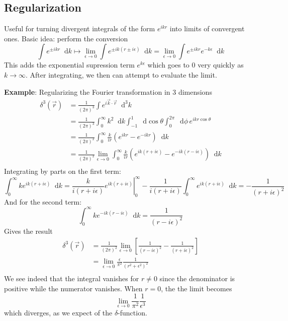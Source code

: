 \documentclass{article}
\newcommand{\diff}{\mathop{}\!\mathrm{d}}
\theoremstyle{definition}
\begin{document}
\subsection{Regularization}
Useful for turning divergent integrals of the form $e^{ikr}$ into limits of convergent
ones. Basic idea: perform the conversion
\begin{equation*}
	\int e^{\pm ikr} \diff k \mapsto \lim_{\epsilon \to 0} \int e^{\pm ik(r \pm i\epsilon)} \diff k = \lim_{\epsilon \to 0} \int e^{\pm ikr} e^{-k\epsilon} \diff k
\end{equation*}
This adds the exponential supression term $e^{k\epsilon}$ which goes to 0 very quickly as
$k \to \infty$. After integrating, we then can attempt to evaluate the limit.

\textbf{Example}: Regularizing the Fourier transformation in 3 dimensions
\begin{equation*}
\begin{split}
	\delta^3(\vec{r})
		&= \frac{1}{(2\pi)^3} \int e^{i\vec{k}\cdot\vec{r}} \diff^3 k \\
		&= \frac{1}{(2\pi)^3} \int_0^\infty k^2 \diff k \int_{-1}^1 \diff \cos\theta \int_0^{2\pi} \diff \phi \, e^{ikr\cos\theta} \\
		&= \frac{1}{(2\pi)^2} \int_0^\infty \frac{k}{ir} \left(e^{ikr} - e^{-ikr}\right) \diff k \\
		&= \frac{1}{(2\pi)^2} \lim_{\epsilon \to 0} \int_0^\infty \frac{k}{ir} \left(e^{ik(r+i\epsilon)} - e^{-ik(r-i\epsilon)}\right) \diff k \\
\end{split}
\end{equation*}
Integrating by parts on the first term:
\begin{equation*}
	\int_0^\infty ke^{ik(r+i\epsilon)} \diff k = \left. \frac{k}{i(r+i\epsilon)}e^{ik(r+i\epsilon)} \right|_0^\infty - \frac{1}{i(r+i\epsilon)} \int_0^\infty e^{ik(r+i\epsilon)} \diff k = -\frac{1}{(r+i\epsilon)^2}
\end{equation*}
And for the second term:
\begin{equation*}
	\int_0^\infty ke^{-ik(r-i\epsilon)} \diff k = \frac{1}{(r-i\epsilon)^2}
\end{equation*}
Gives the result
\begin{equation*}
\begin{split}
	\delta^3(\vec{r})
		&= \frac{1}{(2\pi)^2} \lim_{\epsilon \to 0} \left[ \frac{1}{(r-i\epsilon)^2} - \frac{1}{(r+i\epsilon)^2}\right] \\
		&= \lim_{\epsilon \to 0} \frac{\epsilon}{\pi^2} \frac{1}{(r^2 + \epsilon^2)^2} \\
\end{split}
\end{equation*}
We see indeed that the integral vanishes for $r \neq 0$ since the denominator is positive
while the numerator vanishes. When $r = 0$, the the limit becomes
\begin{equation*}
	\lim_{\epsilon \to 0} \frac{1}{\pi^2} \frac{1}{\epsilon^3}
\end{equation*}
which diverges, as we expect of the $\delta$-function.
\end{document}
